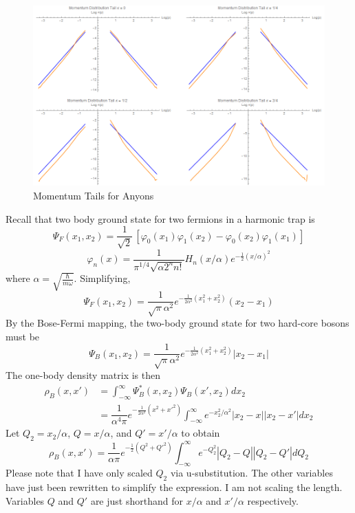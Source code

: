 \documentclass[onecolumn,english,aps,pra]{revtex4}
\begin{document}
\begin{center}
\begin{figure}[h]
	\includegraphics[scale=.45]{"../Plots/FullMomentumTails"}
	\caption{Momentum Tails for Anyons}
	\label{fig:tails}
\end{figure}
\end{center}

Recall that two body ground state for two fermions in a harmonic trap is
\[ \Psi_F(x_1,x_2) = \frac{1}{\sqrt{2}} \,\left[ \varphi_0(x_1) \varphi_1(x_2) -\varphi_0(x_2) \varphi_1(x_1) \right]  \]
\[ \varphi_{n}(x) = \dfrac{1}{\pi^{1/4} \sqrt{\alpha 2^n n!}} H_{n}(x/\alpha) e^{-\frac{1}{2}(x/\alpha)^2} \]
where $\alpha = \sqrt{\frac{\hbar}{m \omega}}$. Simplifying, 
\[ \Psi_{F}(x_{1},x_{2}) = \dfrac{1}{\sqrt{\pi} \alpha^2} e^{-\frac{1}{2\alpha^2} (x_{1}^2 + x_{2}^2)} (x_{2} - x_{1}) \]
By the Bose-Fermi mapping, the two-body ground state for two hard-core bosons must be 
\[ \Psi_{B}(x_{1},x_{2}) = \dfrac{1}{\sqrt{\pi} \alpha^2} e^{-\frac{1}{2\alpha^2} (x_{1}^2 + x_{2}^2)} |x_{2} - x_{1}|  \]
The one-body density matrix is then
\begin{align*}
\rho_{B}(x, x') &= \int_{-\infty}^{\infty} \Psi_{B}^{*}(x ,x_{2}) \Psi_{B}(x' ,x_{2}) dx_{2}\\
& = \dfrac{1}{\alpha^4 \pi} e^{-\frac{1}{2\alpha^2} (x^2 + x'^2)} \int_{-\infty}^{\infty} e^{-x_{2}^{2}/\alpha^2} |x_{2} - x| |x_{2} - x'| dx_{2}
\end{align*}
Let $Q_{2} = x_{2}/\alpha$, $Q = x/\alpha$, and $Q' = x'/\alpha$ to obtain
\begin{equation}
\rho_{B}(x, x') = \dfrac{1}{\alpha \pi} e^{-\frac{1}{2} (Q^2 + Q'^2)} \int_{-\infty}^{\infty} e^{-Q_{2}^{2}} |Q_{2} - Q| |Q_{2} - Q'| dQ_{2}
\end{equation}
Please note that I have only scaled $Q_{2}$ via u-substitution. The other variables have just been rewritten to simplify the expression. I am not scaling the length. Variables $Q$ and $Q'$ are just shorthand for $ x/\alpha$ and $x'/\alpha$ respectively.
\end{document}
